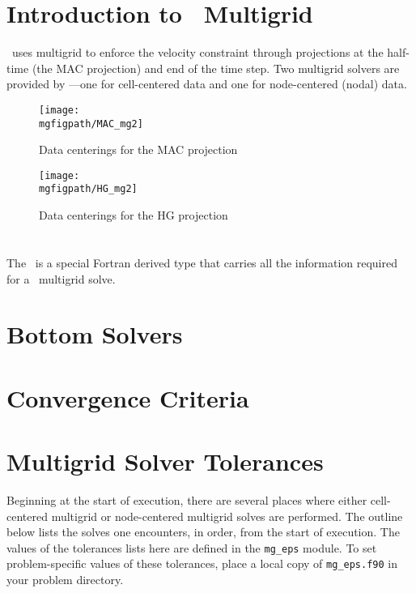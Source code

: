\section{Introduction to \maestro\ Multigrid}

\maestro\ uses multigrid to enforce the velocity constraint through
projections at the half-time (the MAC projection) and end of the time
step.  Two multigrid solvers are provided by \boxlib---one for
cell-centered data and one for node-centered (nodal) data.

\begin{figure}[t]
\centering
\texttt{[image: \\mgfigpath/MAC\_mg2]}
\caption{\label{fig:mg:MAC} Data centerings for the MAC projection}
\end{figure}

\begin{figure}[t]
\centering
\texttt{[image: \\mgfigpath/HG\_mg2]}
\caption{\label{fig:mg:HG} Data centerings for the HG projection}
\end{figure}

\section{\mgtower}

The \mgtower\ is a special Fortran derived type that carries all the
information required for a \boxlib\ multigrid solve.


\section{Bottom Solvers}


\section{Convergence Criteria}


\section{Multigrid Solver Tolerances}

\label{sec:mgtol}

Beginning at the start of execution, there are several places where
either cell-centered multigrid or node-centered multigrid solves are
performed.  The outline below lists the solves one encounters, in order,
from the start of execution.  The values of the tolerances lists here
are defined in the {\tt mg\_eps} module.  To set problem-specific values
of these tolerances, place a local copy of {\tt mg\_eps.f90} in your
problem directory.

